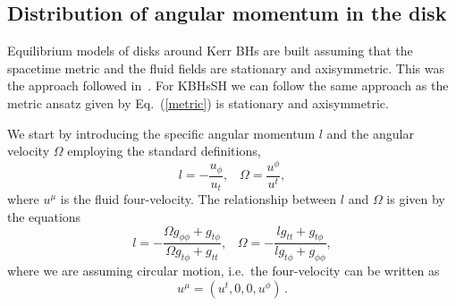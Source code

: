 \documentclass[twocolumn,aps,showpacs,showkeys,prd,superscriptaddress,byrevtex, amsmath]{revtex4-1}
\begin{document}
\subsection{Distribution of angular momentum in the disk}

Equilibrium models of disks around Kerr BHs are built assuming that the spacetime metric and the fluid fields are stationary and  axisymmetric.  This was the approach followed in~\cite{Gimeno-Soler:2017}. For KBHsSH we can follow the same approach as the metric ansatz given by Eq.~(\ref{metric}) is stationary and axisymmetric.


We start by introducing the specific angular momentum $l$ and the angular velocity $\Omega$ employing the standard definitions,
\begin{equation}
l = - \frac{u_{\phi}}{u_t}, \;\;\; \Omega = \frac{u^{\phi}}{u^t},
\end{equation}
where $u^{\mu}$ is the fluid four-velocity.
The relationship between $l$ and $\Omega$ is given by the equations
\begin{equation}
l = - \frac{\Omega g_{\phi\phi} + g_{t\phi}}{\Omega g_{t\phi} + g_{tt}}, \;\;\; \Omega = - \frac{l g_{tt} + g_{t\phi}}{l g_{t\phi} + g_{\phi\phi}},
\end{equation}
where we are assuming circular motion, i.e.~the four-velocity can be written as
\begin{equation}
u^{\mu} = (u^t, 0, 0, u^{\phi})\,.
\end{equation}
\end{document}
